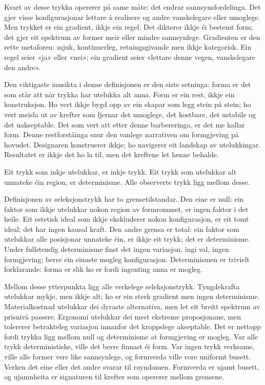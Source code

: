 Kvart av desse trykka opererer på same måte: det endrar sannsynsfordelinga. Det gjer visse konfigurasjonar lettare å realisere og andre vanskelegare eller umoglege. Men trykket er ein gradient, ikkje ein regel. Det dikterer ikkje éi bestemt form; det gjer eit spektrum av former meir eller mindre sannsynlege. Gradienten er den rette metaforen: mjuk, kontinuerleg, retningsgivande men ikkje kategorisk. Ein regel seier «ja» eller «nei»; ein gradient seier «lettare denne vegen, vanskelegare den andre».

Den viktigaste innsikta i denne definisjonen er den siste setninga: forma er det som står att når trykka har utelukka alt anna. Form er ein rest, ikkje ein konstruksjon. Ho vert ikkje bygd opp av ein skapar som legg stein på stein; ho vert meisla ut av krefter som fjernar det umoglege, det kostbare, det ustabile og det uakseptable. Det som vert att etter denne barbereringa, er det me kallar form. Denne restforståinga snur den vanlege narrativen om formgjeving på hovudet. Designaren konstruerer ikkje; ho navigerer eit landskap av utelukkingar. Resultatet er ikkje det ho la til, men det kreftene let henne behalde.

Eit trykk som inkje utelukkar, er inkje trykk. Eit trykk som utelukkar alt unnateke éin region, er determinisme. Alle observerte trykk ligg mellom desse.

Definisjonen av seleksjonstrykk har to grensetilstandar. Den eine er null: ein faktor som ikkje utelukkar nokon region av formrommet, er ingen faktor i det heile. Eit estetisk ideal som ikkje ekskluderer nokon konfigurasjon, er eit tomt ideal; det har ingen kausal kraft. Den andre grensa er total: ein faktor som utelukkar alle posisjonar unnateke éin, er ikkje eit trykk; det er determinisme. Under fullstendig determinisme finst det ingen variasjon, ingi val, ingen formgjeving; berre ein einaste mogleg konfigurasjon. Determinismen er trivielt forklarande: forma er slik ho er fordi ingenting anna er mogleg.

Mellom desse ytterpunkta ligg alle verkelege seleksjonstrykk. Tyngdekrafta utelukkar mykje, men ikkje alt; ho er ein sterk gradient men ingen determinisme. Materialkostnad utelukkar dei dyraste alternativa, men let eit breitt spektrum av prisnivå passere. Ergonomi utelukkar dei mest ekstreme proposjonane, men tolererer betrakteleg variasjon innanfor det kroppslege akseptable. Det er nettopp fordi trykka ligg mellom null og determinisme at formgjeving er mogleg. Var alle trykk deterministiske, ville det berre finnast éi form. Var ingen trykk verksame, ville alle former vere like sannsynlege, og formverda ville vore uniformt busett. Verken det eine eller det andre svarar til røyndomen. Formverda er ujamt busett, og ujamnheita er signaturen til krefter som opererer mellom grensene.

